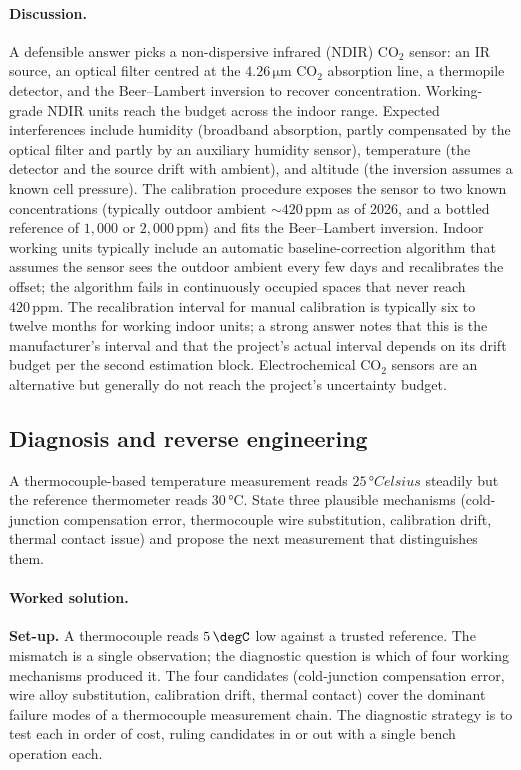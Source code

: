 \paragraph{Discussion.} A defensible answer picks a non-dispersive
infrared (NDIR) CO$_{2}$ sensor: an IR source, an optical filter
centred at the $4.26 \,\si{\micro\meter}$ CO$_{2}$ absorption
line, a thermopile detector, and the Beer--Lambert inversion to
recover concentration. Working-grade NDIR units reach the budget
across the indoor range. Expected interferences include humidity
(broadband absorption, partly compensated by the optical filter
and partly by an auxiliary humidity sensor), temperature (the
detector and the source drift with ambient), and altitude (the
inversion assumes a known cell pressure). The calibration
procedure exposes the sensor to two known concentrations (typically
outdoor ambient $\sim 420 \,\text{ppm}$ as of 2026, and a bottled
reference of $1{,}000$ or $2{,}000 \,\text{ppm}$) and fits the
Beer--Lambert inversion. Indoor working units typically include
an automatic baseline-correction algorithm that assumes the
sensor sees the outdoor ambient every few days and recalibrates
the offset; the algorithm fails in continuously occupied spaces
that never reach $420 \,\text{ppm}$. The recalibration interval
for manual calibration is typically six to twelve months for
working indoor units; a strong answer notes that this is the
manufacturer's interval and that the project's actual interval
depends on its drift budget per the second estimation block.
Electrochemical CO$_{2}$ sensors are an alternative but generally
do not reach the project's uncertainty budget.

\subsection*{Diagnosis and reverse engineering}

\begin{exercise}
A thermocouple-based temperature measurement reads $25 \,\si{\degree
Celsius}$ steadily but the reference thermometer reads $30 \,\si
{\degreeCelsius}$. State three plausible mechanisms (cold-junction
compensation error, thermocouple wire substitution, calibration
drift, thermal contact issue) and propose the next measurement that
distinguishes them.
\end{exercise}

\paragraph{Worked solution.}
\textbf{Set-up.} A thermocouple reads $5 \,\degC$ low against a
trusted reference. The mismatch is a single observation; the
diagnostic question is which of four working mechanisms produced
it. The four candidates (cold-junction compensation error, wire
alloy substitution, calibration drift, thermal contact) cover the
dominant failure modes of a thermocouple measurement chain. The
diagnostic strategy is to test each in order of cost, ruling
candidates in or out with a single bench operation each.

